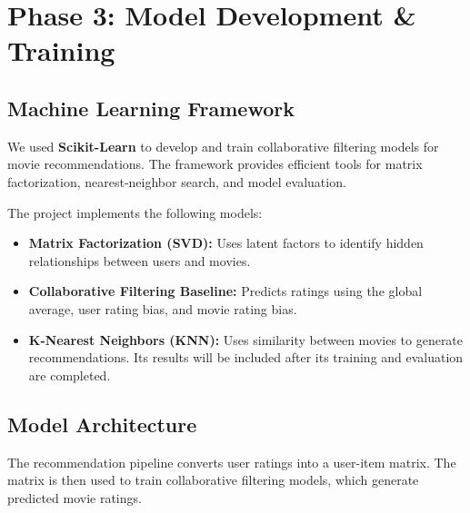 \documentclass[11pt,a4paper]{article}
\begin{document}

\section{Phase 3: Model Development \& Training}

\subsection{Machine Learning Framework}

We used \textbf{Scikit-Learn} to develop and train collaborative
filtering models for movie recommendations. The framework provides
efficient tools for matrix factorization, nearest-neighbor search,
and model evaluation.

The project implements the following models:

\begin{itemize}
    \item \textbf{Matrix Factorization (SVD):} Uses latent factors
    to identify hidden relationships between users and movies.
    \item \textbf{Collaborative Filtering Baseline:} Predicts ratings
    using the global average, user rating bias, and movie rating bias.
    \item \textbf{K-Nearest Neighbors (KNN):} Uses similarity between
    movies to generate recommendations. Its results will be included
    after its training and evaluation are completed.
\end{itemize}

\subsection{Model Architecture}

The recommendation pipeline converts user ratings into a
user-item matrix. The matrix is then used to train collaborative
filtering models, which generate predicted movie ratings.
\end{document}
